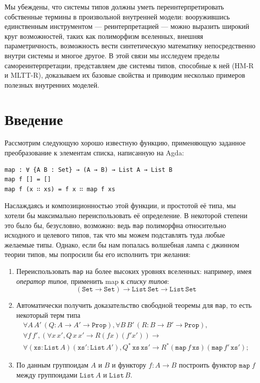 Мы убеждены, что системы типов должны уметь
переинтерпретировать собственные термины в произвольной
внутренней модели: вооружившись единственным
инструментом --- реинтерпретацией --- можно выразить
широкий круг возможностей, таких как полиморфизм
вселенных, внешняя параметричность, возможность вести
синтетическую математику непосредственно внутри системы
и многое другое. В этой связи мы исследуем пределы
самореинтерпретации, представляем две системы типов,
способные к ней (HM-R и MLTT-R), доказываем их базовые
свойства и приводим несколько примеров полезных
внутренних моделей.

\section{Введение}

Рассмотрим следующую хорошо известную функцию,
применяющую заданное преобразование к элементам списка,
написанную на Agda:

\begin{verbatim}
map : ∀ {A B : Set} → (A → B) → List A → List B
map f [] = []
map f (x ∷ xs) = f x ∷ map f xs
\end{verbatim}

Наслаждаясь и композиционностью этой функции, и
простотой её типа, мы хотели бы максимально
переиспользовать её определение. В некоторой степени
это было бы, безусловно, возможно: ведь \texttt{map}
полиморфна относительно исходного и целевого типов, так
что мы можем подставлять туда любые желаемые типы.
Однако, если бы нам попалась волшебная лампа с джинном
теории типов, мы попросили бы его исполнить три
желания:

\begin{enumerate}
    \item Переиспользовать \texttt{map} на более
        высоких уровнях вселенных: например, имея
        \textit{оператор типов}, применить map к
        \textit{списку типов}:
        \[
            (\mathtt{Set}\to\mathtt{Set})\to
            \mathtt{List}\,\mathtt{Set}\to
            \mathtt{List}\,\mathtt{Set}
        \]
    \item Автоматически получить доказательство
        свободной теоремы для \texttt{map}, то есть
        некоторый терм типа
        \begin{multline*}
            \forall A\,A'\,(Q:A\to A'\to\mathtt{Prop}),
            \forall B\,B'\,(R:B\to B'\to\mathtt{Prop}),
            \\
            \forall f\,f',\left(
            \forall x\,x',Q\,x\,x'\to
            R(f x)\left(f' x'\right)
            \right)\to\\
            \forall
            (\mathtt{xs}:\mathtt{List}\,A)
            (\mathtt{xs}':\mathtt{List}\,A'),
            Q^*\,\mathtt{xs}\,\mathtt{xs}'\to
            R^*(\mathtt{map}\,f\,\mathtt{xs})
            (\mathtt{map}\,f'\,\mathtt{xs}');
        \end{multline*}
    \item По данным группоидам $A$ и $B$ и функтору
        $f: A \to B$ построить функтор
        $\mathtt{map}\;f$ между группоидами
        $\mathtt{List}\,A$ и $\mathtt{List}\,B$.
\end{enumerate}

